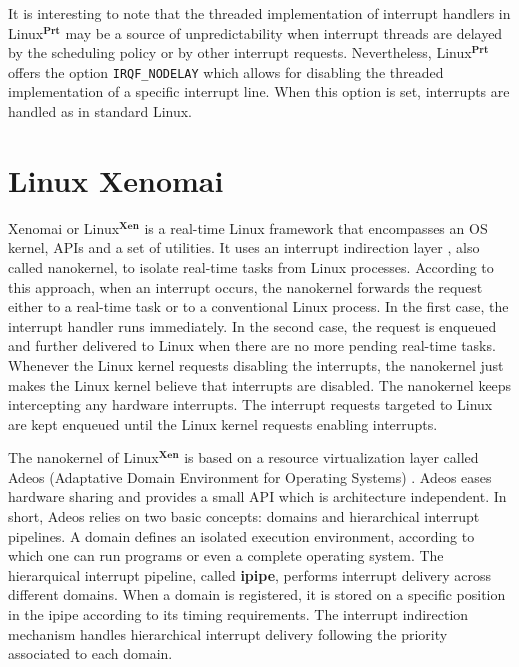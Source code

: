 \documentclass{acm_proc_article-sp}
\newcommand{\cod}[1]{\hspace{0.1cm}\texttt{#1}}
\begin{document}
It is interesting to note that the threaded implementation of interrupt handlers in
Linux$^{\mathbf{Prt}}$ may be a source of unpredictability when interrupt threads
are delayed by the scheduling policy or by other interrupt requests. Nevertheless,
Linux$^{\mathbf{Prt}}$ offers the option \cod{IRQF\_NODELAY} which allows for
disabling the threaded implementation of a specific interrupt line. When this option
is set, interrupts are handled as in standard Linux. 
\newline

\section{Linux Xenomai}
\label{sec:xenomai}

Xenomai or Linux$^{\mathbf{Xen}}$ is a real-time Linux framework that encompasses an
OS kernel, APIs and a set of utilities. It uses an interrupt indirection layer
\cite{Stodolsky93}, also called nanokernel, to isolate real-time tasks from Linux
processes. According to this approach, when an interrupt occurs, the nanokernel
forwards the request either to a real-time task or to a conventional Linux
process. In the first case, the interrupt handler runs immediately. In the second
case, the request is enqueued and further delivered to Linux when there are no
more pending real-time tasks. Whenever the Linux kernel requests disabling the
interrupts, the nanokernel just makes the Linux kernel believe that interrupts are
disabled. The nanokernel keeps intercepting any hardware interrupts.  The interrupt
requests targeted to Linux are kept enqueued until the Linux kernel requests
enabling interrupts.

The nanokernel of Linux$^{\mathbf{Xen}}$ is based on a resource virtualization layer
called Adeos (Adaptative Domain Environment for Operating Systems)
\cite{Yaghmour01}. Adeos eases hardware sharing and provides a small API which is
architecture independent. In short, Adeos relies on two basic concepts: domains and
hierarchical interrupt pipelines. A domain defines an isolated execution
environment, according to which one can run programs or even a complete operating
system. The hierarquical interrupt pipeline, called \textbf{ipipe}, performs
interrupt delivery across different domains. When a domain is registered, it is
stored on a specific position in the ipipe according to its timing requirements. The
interrupt indirection mechanism handles hierarchical interrupt delivery following
the priority associated to each domain.
\end{document}
